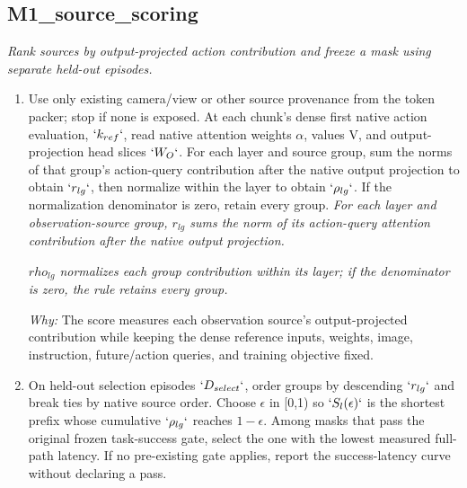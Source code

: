 \documentclass[10pt,a4paper]{article}
\begin{document}
\subsection*{M1\_source\_scoring}
\emph{Rank sources by output-projected action contribution and freeze a mask using separate held-out episodes.}
\begin{enumerate}[leftmargin=*,start=3]
  \item Use only existing camera/view or other source provenance from the token packer;\allowbreak{} stop if none is exposed. At each chunk's dense first native action evaluation, \(`k_{ref}`\), read native attention weights \(\alpha \), values V, and output-projection head slices \(`W_{O}`\). For each layer and source group, sum the norms of that group's action-query contribution after the native output projection to obtain \(`r_{lg}`\), then normalize within the layer to obtain \(`\rho _{lg}`\). If the normalization denominator is zero, retain every group.
\noindent\emph{For each layer and observation-source group, \(r_{lg}\) sums the norm of its action-query attention contribution after the native output projection.}
\par{}
\noindent\emph{\(rho_{lg}\) normalizes each group contribution within its layer;\allowbreak{} if the denominator is zero, the rule retains every group.}
\par{}
\par\emph{Why:} The score measures each observation source's output-projected contribution while keeping the dense reference inputs, weights, image, instruction, future/action queries, and training objective fixed.
  \item On held-out selection episodes \(`D_{select}`\), order groups by descending \(`r_{lg}`\) and break ties by native source order. Choose \(\epsilon \) in [0,1) so \(`S_{l}(\epsilon )`\) is the shortest prefix whose cumulative \(`\rho _{lg}`\) reaches \(1- \epsilon \). Among masks that pass the original frozen task-success gate, select the one with the lowest measured full-path latency. If no pre-existing gate applies, report the success-latency curve without declaring a pass.

\end{enumerate}
\end{document}
